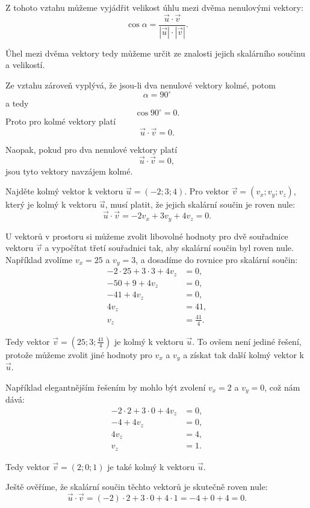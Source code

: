 Z tohoto vztahu můžeme vyjádřit velikost úhlu mezi dvěma nenulovými
vektory:
\begin{equation}
    \cos\alpha
    =
    \frac{\vec{u}\cdot\vec{v}}
    {|\vec{u}|\cdot|\vec{v}|}.
    \label{eq:Angle_between_vectors_space}
\end{equation}

Úhel mezi dvěma vektory tedy můžeme určit ze znalosti jejich
skalárního součinu a velikostí.

Ze vztahu zároveň vyplývá, že jsou-li dva nenulové vektory kolmé,
potom
\[
    \alpha=90^\circ
\]
a tedy
\[
    \cos90^\circ=0.
\]
Proto pro kolmé vektory platí
\[
    \vec{u}\cdot\vec{v}=0.
\]

Naopak, pokud pro dva nenulové vektory platí
\[
    \vec{u}\cdot\vec{v}=0,
\]
jsou tyto vektory navzájem kolmé.

\begin{example}
    Najděte kolmý vektor k vektoru $\vec{u} = (-2;3;4)$.
    Pro vektor $\vec{v} = (v_x; v_y; v_z)$, který je kolmý k vektoru $\vec{u}$, musí platit, že jejich skalární součin je roven nule:
    \[
    \vec{u} \cdot \vec{v} = -2 v_x + 3 v_y + 4 v_z = 0.
    \]

    U vektorů v prostoru si můžeme zvolit libovolné hodnoty pro dvě souřadnice vektoru $\vec{v}$ a vypočítat třetí souřadnici tak, aby skalární součin byl roven nule.
    Například zvolíme $v_x = 25$ a $v_y = 3$, a dosadíme do rovnice pro skalární součin:
    \begin{align*}
        -2 \cdot 25 + 3 \cdot 3 + 4 v_z &= 0,\\
        -50 + 9 + 4 v_z &= 0,\\
        -41 + 4 v_z &= 0,\\
        4 v_z &= 41,\\
        v_z &= \frac{41}{4}.
    \end{align*}

    Tedy vektor $\vec{v} = \left(25; 3; \frac{41}{4}\right)$ je kolmý k vektoru $\vec{u}$.
    To ovšem není jediné řešení, protože můžeme zvolit jiné hodnoty pro $v_x$ a $v_y$ a získat tak další kolmý vektor k $\vec{u}$.

    Například elegantnějším řešením by mohlo být zvolení $v_x = 2$ a $v_y = 0$, což nám dává:
    \begin{align*}
        -2 \cdot 2 + 3 \cdot 0 + 4 v_z &= 0,\\
        -4 + 4 v_z &= 0,\\
        4 v_z &= 4,\\
        v_z &= 1.
    \end{align*}

    Tedy vektor $\vec{v} = (2; 0; 1)$ je také kolmý k vektoru $\vec{u}$.

    Ještě ověříme, že skalární součin těchto vektorů je skutečně roven nule:
    \[
    \vec{u} \cdot \vec{v} = (-2) \cdot 2 + 3 \cdot 0 + 4 \cdot 1 = -4 + 0 + 4 = 0.
    \]
\end{example}

